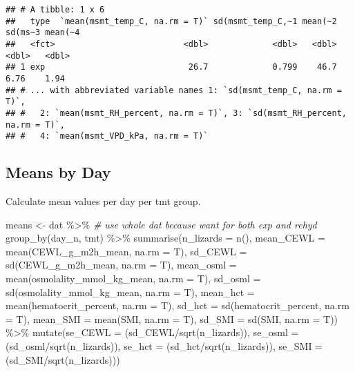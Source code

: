 \documentclass[
]{article}
\newenvironment{Shaded}{\begin{snugshade}}{\end{snugshade}}
\newcommand{\AttributeTok}[1]{\textcolor[rgb]{0.77,0.63,0.00}{#1}}
\newcommand{\CommentTok}[1]{\textcolor[rgb]{0.56,0.35,0.01}{\textit{#1}}}
\newcommand{\FunctionTok}[1]{\textcolor[rgb]{0.00,0.00,0.00}{#1}}
\newcommand{\NormalTok}[1]{#1}
\newcommand{\OtherTok}[1]{\textcolor[rgb]{0.56,0.35,0.01}{#1}}
\newcommand{\SpecialCharTok}[1]{\textcolor[rgb]{0.00,0.00,0.00}{#1}}
\begin{document}
\begin{verbatim}
## # A tibble: 1 x 6
##   type  `mean(msmt_temp_C, na.rm = T)` sd(msmt_temp_C,~1 mean(~2 sd(ms~3 mean(~4
##   <fct>                          <dbl>             <dbl>   <dbl>   <dbl>   <dbl>
## 1 exp                             26.7             0.799    46.7    6.76    1.94
## # ... with abbreviated variable names 1: `sd(msmt_temp_C, na.rm = T)`,
## #   2: `mean(msmt_RH_percent, na.rm = T)`, 3: `sd(msmt_RH_percent, na.rm = T)`,
## #   4: `mean(msmt_VPD_kPa, na.rm = T)`
\end{verbatim}

\hypertarget{means-by-day}{%
\subsection{Means by Day}\label{means-by-day}}

Calculate mean values per day per tmt group.

\begin{Shaded}
\begin{Highlighting}[]
\NormalTok{means }\OtherTok{\textless{}{-}}\NormalTok{ dat }\SpecialCharTok{\%\textgreater{}\%} \CommentTok{\# use whole dat because want for both exp and rehyd}
  \FunctionTok{group\_by}\NormalTok{(day\_n, tmt) }\SpecialCharTok{\%\textgreater{}\%}
  \FunctionTok{summarise}\NormalTok{(}\AttributeTok{n\_lizards =} \FunctionTok{n}\NormalTok{(),}
            \AttributeTok{mean\_CEWL =} \FunctionTok{mean}\NormalTok{(CEWL\_g\_m2h\_mean, }\AttributeTok{na.rm =}\NormalTok{ T),}
            \AttributeTok{sd\_CEWL =} \FunctionTok{sd}\NormalTok{(CEWL\_g\_m2h\_mean, }\AttributeTok{na.rm =}\NormalTok{ T),}
            \AttributeTok{mean\_osml =} \FunctionTok{mean}\NormalTok{(osmolality\_mmol\_kg\_mean, }\AttributeTok{na.rm =}\NormalTok{ T),}
            \AttributeTok{sd\_osml =} \FunctionTok{sd}\NormalTok{(osmolality\_mmol\_kg\_mean, }\AttributeTok{na.rm =}\NormalTok{ T),}
            \AttributeTok{mean\_hct =} \FunctionTok{mean}\NormalTok{(hematocrit\_percent, }\AttributeTok{na.rm =}\NormalTok{ T),}
            \AttributeTok{sd\_hct =} \FunctionTok{sd}\NormalTok{(hematocrit\_percent, }\AttributeTok{na.rm =}\NormalTok{ T),}
            \AttributeTok{mean\_SMI =} \FunctionTok{mean}\NormalTok{(SMI, }\AttributeTok{na.rm =}\NormalTok{ T),}
            \AttributeTok{sd\_SMI =} \FunctionTok{sd}\NormalTok{(SMI, }\AttributeTok{na.rm =}\NormalTok{ T)) }\SpecialCharTok{\%\textgreater{}\%}
  \FunctionTok{mutate}\NormalTok{(}\AttributeTok{se\_CEWL =}\NormalTok{ (sd\_CEWL}\SpecialCharTok{/}\FunctionTok{sqrt}\NormalTok{(n\_lizards)),}
         \AttributeTok{se\_osml =}\NormalTok{ (sd\_osml}\SpecialCharTok{/}\FunctionTok{sqrt}\NormalTok{(n\_lizards)),}
         \AttributeTok{se\_hct =}\NormalTok{ (sd\_hct}\SpecialCharTok{/}\FunctionTok{sqrt}\NormalTok{(n\_lizards)),}
         \AttributeTok{se\_SMI =}\NormalTok{ (sd\_SMI}\SpecialCharTok{/}\FunctionTok{sqrt}\NormalTok{(n\_lizards)))}
\end{Highlighting}
\end{Shaded}
\end{document}
